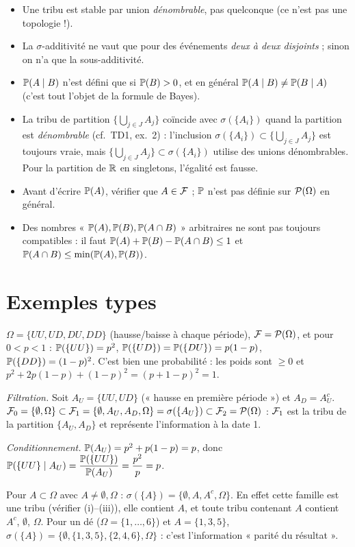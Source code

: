 \documentclass[11pt,a4paper]{article}
\begin{document}
\begin{piege}
\begin{itemize}
  \item Une tribu est stable par union \emph{dénombrable}, pas quelconque (ce n'est pas une topologie !).
  \item La $\sigma$-additivité ne vaut que pour des événements \emph{deux à deux disjoints} ; sinon on n'a que
  la sous-additivité.
  \item $\mathbb{P}(A\mid B)$ n'est défini que si $\mathbb{P}(B)>0$, et en général $\mathbb{P}(A\mid B)\neq\mathbb{P}(B\mid A)$
  (c'est tout l'objet de la formule de Bayes).
  \item La tribu de partition $\{\bigcup_{j\in J}A_j\}$ coïncide avec $\sigma(\{A_i\})$ quand la partition est
  \emph{dénombrable} (cf.\ TD1, ex.~2) : l'inclusion $\sigma(\{A_i\})\subset\{\bigcup_{j\in J}A_j\}$ est toujours vraie, mais $\{\bigcup_{j\in J}A_j\}\subset\sigma(\{A_i\})$ utilise des unions dénombrables. Pour la partition de $\mathbb{R}$ en singletons, l'égalité est fausse.
  \item Avant d'écrire $\mathbb{P}(A)$, vérifier que $A\in\mathcal{F}$ ; $\mathbb{P}$ n'est pas définie sur $\mathcal{P}(\Omega)$ en général.
  \item Des nombres « $\mathbb{P}(A),\mathbb{P}(B),\mathbb{P}(A\cap B)$ » arbitraires ne sont pas toujours compatibles :
  il faut $\mathbb{P}(A)+\mathbb{P}(B)-\mathbb{P}(A\cap B)\le 1$ et $\mathbb{P}(A\cap B)\le\min(\mathbb{P}(A),\mathbb{P}(B))$.
\end{itemize}
\end{piege}

\section*{Exemples types}

\begin{exemple}\label{C1:ex-arbre}
$\Omega=\{UU,UD,DU,DD\}$ (hausse/baisse à chaque période), $\mathcal{F}=\mathcal{P}(\Omega)$, et pour $0<p<1$ :
$\mathbb{P}(\{UU\})=p^2$, $\mathbb{P}(\{UD\})=\mathbb{P}(\{DU\})=p(1-p)$, $\mathbb{P}(\{DD\})=(1-p)^2$.
C'est bien une probabilité : les poids sont $\ge0$ et $p^2+2p(1-p)+(1-p)^2=(p+1-p)^2=1$.

\emph{Filtration.} Soit $A_U=\{UU,UD\}$ (« hausse en première période ») et $A_D=A_U^c$.
$\mathcal{F}_0=\{\emptyset,\Omega\}\subset\mathcal{F}_1=\{\emptyset,A_U,A_D,\Omega\}=\sigma(\{A_U\})\subset\mathcal{F}_2=\mathcal{P}(\Omega)$ :
$\mathcal{F}_1$ est la tribu de la partition $\{A_U,A_D\}$ et représente l'information à la date 1.

\emph{Conditionnement.} $\mathbb{P}(A_U)=p^2+p(1-p)=p$, donc
$\mathbb{P}(\{UU\}\mid A_U)=\dfrac{\mathbb{P}(\{UU\})}{\mathbb{P}(A_U)}=\dfrac{p^2}{p}=p$.
\end{exemple}

\begin{exemple}
Pour $A\subset\Omega$ avec $A\neq\emptyset,\Omega$ : $\sigma(\{A\})=\{\emptyset,A,A^c,\Omega\}$. En effet cette famille
est une tribu (vérifier (i)--(iii)), elle contient $A$, et toute tribu contenant $A$ contient $A^c$, $\emptyset$, $\Omega$.
Pour un dé ($\Omega=\{1,\dots,6\}$) et $A=\{1,3,5\}$, $\sigma(\{A\})=\{\emptyset,\{1,3,5\},\{2,4,6\},\Omega\}$ :
c'est l'information « parité du résultat ».
\end{exemple}
\end{document}
